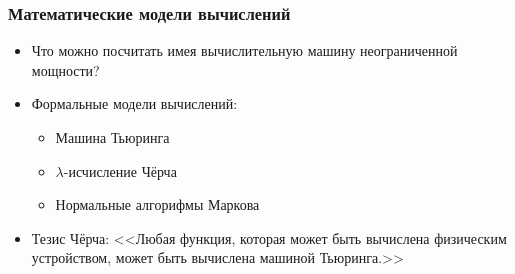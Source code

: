 \documentclass{../../slides-style}
\begin{document}
    
    \begin{frame}[plain]
        \titlepage
    \end{frame}

    \begin{frame}
        \frametitle{Математические модели вычислений}
        \begin{itemize}
            \item Что можно посчитать имея вычислительную машину неограниченной мощности?
            \item Формальные модели вычислений:
            \begin{itemize}
                \item Машина Тьюринга
                \item $\lambda$-исчисление Чёрча
                \item Нормальные алгорифмы Маркова
            \end{itemize}
            \item Тезис Чёрча: <<Любая функция, которая может быть вычислена физическим устройством, может быть вычислена машиной Тьюринга.>>
        \end{itemize}
    \end{frame}
\end{document}
